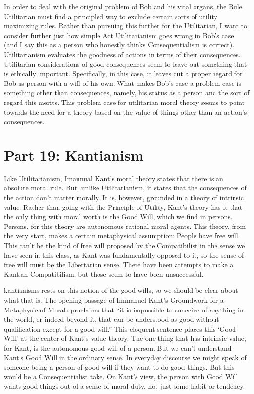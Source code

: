 In order to deal with the original problem of Bob and his vital organs, the Rule Utilitarian must find a principled way to exclude certain sorts of utility maximizing rules. Rather than pursuing this further for the Utilitarian, I want to consider further just how simple Act Utilitarianism goes wrong in Bob’s case (and I say this as a person who honestly thinks Consequentialism is correct). Utilitarianism evaluates the goodness of actions in terms of their consequences. Utilitarian considerations of good consequences seem to leave out something that is ethically important. Specifically, in this case, it leaves out a proper regard for Bob as person with a will of his own. What makes Bob’s case a problem case is something other than consequences, namely, his status as a person and the sort of regard this merits. This problem case for utilitarian moral theory seems to point towards the need for a theory based on the value of things other than an action’s consequences.

\chapter{Part 19: Kantianism}

Like Utilitarianism, Imannual Kant’s moral theory states that there is an absolute moral rule. But, unlike Utilitarianism, it states that the consequences of the action don't matter morally. It is, however, grounded in a theory of intrinsic value. Rather than going with the Principle of Utility, Kant's theory has it that the only thing with moral worth is the Good Will, which we find in persons. Persons, for this theory are  autonomous rational moral agents. This theory, from the very start, makes a certain metaphysical assumption: People have free will. This can't be the kind of free will proposed by the Compatibilist in the sense we have seen in this class, as Kant was fundamentally opposed to it, so the sense of free will must be the Libertarian sense. There have been attempts to make a Kantian Compatibilism, but those seem to have been unsuccessful.

\glspl{kantianism} rests on this notion of the \glspl{good will}, so we should be clear about what that is. The opening passage of Immanuel Kant’s Groundwork for a Metaphysic of Morals proclaims that “it is impossible to conceive of anything in the world, or indeed beyond it, that can be understood as good without qualification except for a good will.” This eloquent sentence places this `Good Will' at the center of Kant's value theory. The one thing that has intrinsic value, for Kant, is the autonomous good will of a person. But we can't understand Kant's Good Will in the ordinary sense. In everyday discourse we might speak of someone being a person of good will if they want to do good things. But this would be a Consequentialist take. On Kant’s view, the person with Good Will wants  good things out of a sense of moral duty, not just some habit or tendency.

